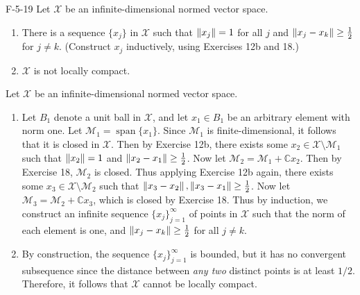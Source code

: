 \documentclass{article}
\begin{document}
	
	\begin{prb}{F-5-19}
		Let $\mathscr{X}$ be an infinite-dimensional normed vector space. \vspace{-0.25cm}
		\begin{enumerate}[itemsep =-2pt,label = (\alph{*})]
			\item There is a sequence $\{x_{j}\}$ in $\mathscr{X}$ such that $\left\Vert x_{j} \right\Vert = 1$ for all $j$ and $\left\Vert x_{j} - x_{k} \right\Vert \geq \frac{1}{2}$ for $j \neq k$. (Construct $x_{j}$ inductively, using Exercises 12b and 18.)
			\item $\mathscr{X}$ is not locally compact. 
		\end{enumerate}
	\end{prb}
	Let $\mathscr{X}$ be an infinite-dimensional normed vector space. \vspace{-0.25cm}
	\begin{enumerate}[itemsep =-2pt,label = (\alph{*})]
		\item Let $B_{1}$ denote a unit ball in $\mathscr{X}$, and let $x_{1} \in B_{1}$ be an arbitrary element with norm one. Let $\mathscr{M}_{1} = \operatorname{span}\{x_{1}\}$. Since $\mathscr{M}_{1}$ is finite-dimensional, it follows that it is closed in $\mathscr{X}$. Then by Exercise 12b, there exists some $x_{2} \in \mathscr{X}\setminus \mathscr{M}_{1}$ such that $\left\Vert x_{2} \right\Vert = 1$ and $\left\Vert x_{2} - x_{1} \right\Vert \geq \frac{1}{2}$. Now let $\mathscr{M}_{2} = \mathscr{M}_{1} + \mathbb{C}x_{2}$. Then by Exercise 18, $\mathscr{M}_{2}$ is closed. Thus applying Exercise 12b again, there exists some $x_{3} \in \mathscr{X}\setminus \mathscr{M}_{2}$ such that $\left\Vert x_{3} - x_{2} \right\Vert, \left\Vert x_{3} - x_{1} \right\Vert \geq \frac{1}{2}$. Now let $\mathscr{M}_{3} = \mathscr{M}_{2} + \mathbb{C}x_{3}$, which is closed by Exercise 18. Thus by induction, we construct an infinite sequence $\{x_{j}\}_{j = 1}^{\infty}$ of points in $\mathscr{X}$ such that the norm of each element is one, and $\left\Vert x_{j} - x_{k} \right\Vert \geq \frac{1}{2}$ for all $j \neq k$. 
		\item By construction, the sequence $\{x_{j}\}_{j = 1}^{\infty}$ is bounded, but it has no convergent subsequence since the distance between \textit{any two} distinct points is at least $1/2$. Therefore, it follows that $\mathscr{X}$ cannot be locally compact. 
	\end{enumerate}
		
\end{document}
